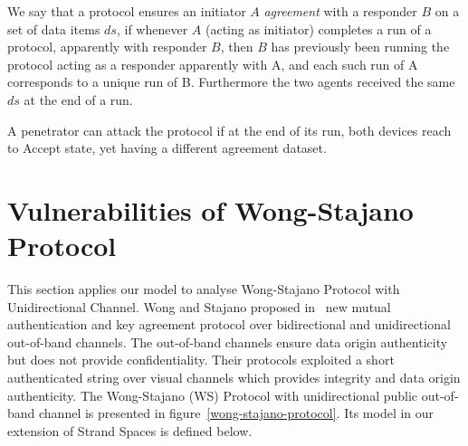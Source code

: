 \begin{Definition} We say that a protocol ensures an initiator $A$ \textit{agreement} with a responder $B$ on a set of data items $ds$, if whenever $A$ (acting as initiator) completes a run of a protocol, apparently with responder $B$, then $B$ has previously been running the protocol acting as a responder apparently with A, and each such run of A corresponds to a unique run of B. Furthermore the two agents received the same $ds$ at the end of a run. 
\end{Definition}

A penetrator can attack the protocol if at the end of its run, both devices reach to Accept state, yet having a different agreement dataset. 

\section{Vulnerabilities of Wong-Stajano Protocol}\label{analysisWSP}

This section applies our model to analyse Wong-Stajano Protocol with Unidirectional Channel. Wong and Stajano proposed in~\cite{10.1109/MPRV.2007.76} new mutual authentication and key agreement protocol over bidirectional and unidirectional out-of-band channels. The out-of-band channels ensure data origin authenticity but does not provide confidentiality. Their protocols exploited a short authenticated string over visual channels which provides integrity and data origin authenticity. The Wong-Stajano (WS) Protocol with unidirectional public out-of-band channel is presented in figure~\ref{wong-stajano-protocol}. Its model in our extension of Strand Spaces is defined below.

